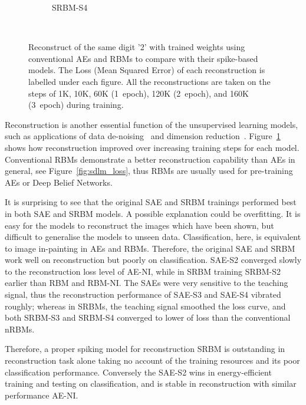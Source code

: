 \begin{figure}
\begin{subfigure}[t]{0.32\textwidth}
		\caption{SRBM-S4}
	\end{subfigure}\\
	\caption{Reconstruct of the same digit '2' with trained weights using \DIFdelbeginFL {}\DIFdelendFL conventional AEs and RBMs to compare with their spike-based models.
		The Loss (Mean Squared Error) of each reconstruction is labelled under each figure.
		All the reconstructions are taken on the steps of 1K, 10K, 60K (1~epoch), 120K (2~epoch), and 160K (3~epoch) during training.}
	\label{fig:sdlm_recon}
\end{figure}

Reconstruction is another essential function of the unsupervised learning models, such as applications of data de-noising~\citep{xie2012image} and dimension reduction~\citep{hinton2006fast}.
Figure~\ref{fig:sdlm_recon} shows how reconstruction improved over increasing training steps for each model.
Conventional RBMs demonstrate a better reconstruction capability than AEs in general, see Figure~\ref{fig:sdlm_loss}, thus RBMs are usually used for pre-training \DIFdelbegin {}\DIFdelend AEs or Deep Belief Networks.

It is surprising to see that the original SAE and SRBM trainings performed best in both SAE and SRBM models.
A possible explanation could be overfitting.
It is easy for the models to reconstruct the images which have been shown, but difficult to generalise the models to unseen data.
Classification, here, is equivalent to image in-painting in AEs and RBMs.
Therefore, the original SAE and SRBM work well on reconstruction but poorly on classification.
SAE-S2 converged slowly to the reconstruction loss level of AE-NI, while in SRBM training \DIFdelbegin {}\DIFdelend SRBM-S2 \DIFdelbegin {}\DIFdelend \DIFaddbegin {}\DIFaddend earlier than RBM and RBM-NI.
The SAEs were very sensitive to the teaching signal, thus the reconstruction performance of SAE-S3 and SAE-S4 vibrated roughly; 
whereas in SRBMs, the teaching signal smoothed the loss curve, and both \DIFdelbegin {}\DIFdelend SRBM-S3 and SRBM-S4 converged to lower \DIFdelbegin {}\DIFdelend \DIFaddbegin {}\DIFaddend of loss than the conventional nRBMs.

Therefore, \DIFdelbegin {}\DIFdelend \DIFaddbegin {}\DIFaddend a proper spiking model for reconstruction \DIFdelbegin {}\DIFdelend \DIFaddbegin {}\DIFaddend SRBM is outstanding in \DIFaddbegin {}\DIFaddend reconstruction task alone taking no account of the training resources and its poor classification performance.
Conversely the SAE-S2 wins in energy-efficient training and testing on classification, and is stable in reconstruction with similar performance \DIFdelbegin {}\DIFdelend \DIFaddbegin {}\DIFaddend AE-NI.

